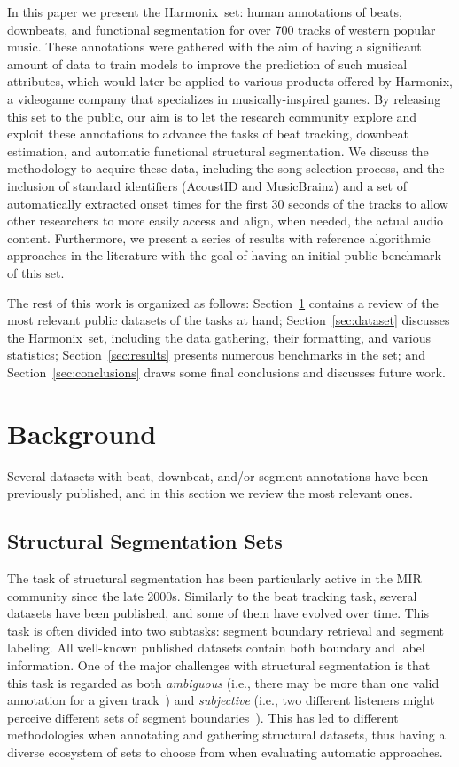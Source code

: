 \documentclass{article}
\newcommand{\setName}{Harmonix}
\begin{document}
In this paper we present the \setName~set: human annotations of beats, downbeats, and functional segmentation for over 700 tracks of western popular music.
These annotations were gathered with the aim of having a significant amount of data to train models to improve the prediction of such musical attributes, which would later be applied to various products offered by Harmonix, a videogame company that specializes in musically-inspired games.
By releasing this set to the public, our aim is to let the research community explore and exploit these annotations to advance the tasks of beat tracking, downbeat estimation, and automatic functional structural segmentation.
We discuss the methodology to acquire these data, including the song selection process, and the inclusion of standard identifiers (AcoustID and MusicBrainz) and a set of automatically extracted onset times for the first 30 seconds of the tracks to allow other researchers to more easily access and align, when needed, the actual audio content.
Furthermore, we present a series of results with reference algorithmic approaches in the literature with the goal of having an initial public benchmark of this set.

The rest of this work is organized as follows: Section~\ref{sec:background} contains a review of the most relevant public datasets of the tasks at hand; Section~\ref{sec:dataset} discusses the \setName~set, including the data gathering, their formatting, and various statistics; Section~\ref{sec:results} presents numerous benchmarks in the set; and Section~\ref{sec:conclusions} draws some final conclusions and discusses future work.
%
\section{Background}\label{sec:background}

Several datasets with beat, downbeat, and/or segment annotations have been previously published, and in this section we review the most relevant ones.



\subsection{Structural Segmentation Sets}\label{sub:structsegm}

The task of structural segmentation has been particularly active in the MIR community since the late 2000s.
Similarly to the beat tracking task, several datasets have been published, and some of them have evolved over time.
This task is often divided into two subtasks: segment boundary retrieval and segment labeling.
All well-known published datasets contain both boundary and label information.
One of the major challenges with structural segmentation is that this task is regarded as both \textit{ambiguous} (i.e., there may be more than one valid annotation for a given track~\cite{McFee2017}) and \textit{subjective} (i.e., two different listeners might perceive different sets of segment boundaries~\cite{Bruderer2009}).
This has led to different methodologies when annotating and gathering structural datasets, thus having a diverse ecosystem of sets to choose from when evaluating automatic approaches.
\end{document}
